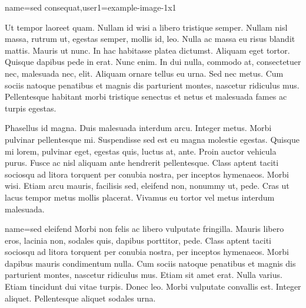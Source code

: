 %
{name={sed consequat},user1={example-image-1x1}}%
{%
Ut tempor laoreet quam. Nullam id wisi a libero tristique semper.
Nullam nisl massa, rutrum ut, egestas semper, mollis id, leo. Nulla
ac massa eu risus blandit mattis. Mauris ut nunc. In hac habitasse
platea dictumst.  Aliquam eget tortor. Quisque dapibus pede in erat.
Nunc enim. In dui nulla, commodo at, consectetuer nec, malesuada
nec, elit. Aliquam ornare tellus eu urna. Sed nec metus. Cum sociis
natoque penatibus et magnis dis parturient montes, nascetur
ridiculus mus.  Pellentesque habitant morbi tristique senectus et
netus et malesuada fames ac turpis egestas.

Phasellus id magna. Duis malesuada interdum arcu.  Integer metus.
Morbi pulvinar pellentesque mi. Suspendisse sed est eu magna
molestie egestas. Quisque mi lorem, pulvinar eget, egestas quis,
luctus at, ante. Proin auctor vehicula purus. Fusce ac nisl aliquam
ante hendrerit pellentesque. Class aptent taciti sociosqu ad litora
torquent per conubia nostra, per inceptos hymenaeos. Morbi wisi.
Etiam arcu mauris, facilisis sed, eleifend non, nonummy ut, pede.
Cras ut lacus tempor metus mollis placerat.  Vivamus eu tortor vel
metus interdum malesuada.
}


%
{name={sed eleifend}}%
{%
Morbi non felis ac libero vulputate fringilla. Mauris libero eros,
lacinia non, sodales quis, dapibus porttitor, pede.  Class aptent
taciti sociosqu ad litora torquent per conubia nostra, per inceptos
hymenaeos. Morbi dapibus mauris condimentum nulla.  Cum sociis
natoque penatibus et magnis dis parturient montes, nascetur
ridiculus mus. Etiam sit amet erat. Nulla varius. Etiam tincidunt
dui vitae turpis. Donec leo. Morbi vulputate convallis est.  Integer
aliquet. Pellentesque aliquet sodales urna.
}
